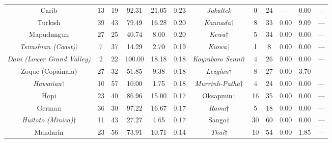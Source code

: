 \begin{tabular}{cccccccccccc}
Carib & 13 & 19 & 92.31 & 21.05 & 0.23 & \emph{Jakaltek} & 0 & 24 & --- & 0.00 & --- \\
Turkish & 39 & 43 & 79.49 & 16.28 & 0.20 & \emph{Kannada}$\dagger$ & 8 & 33 & 0.00 & 9.09 & --- \\
Mapudungun & 27 & 25 & 40.74 & 8.00 & 0.20 & \emph{Kewa}$\dagger$ & 5 & 34 & 0.00 & 0.00 & --- \\
\emph{Tsimshian (Coast)}$\dagger$ & 7 & 37 & 14.29 & 2.70 & 0.19 & \emph{Kiowa}$\dagger$ & 1 & 8 & 0.00 & 0.00 & --- \\
\emph{Dani (Lower Grand Valley)} & 2 & 22 & 100.00 & 18.18 & 0.18 & \emph{Koyraboro Senni}$\dagger$ & 4 & 26 & 0.00 & 0.00 & --- \\
Zoque (Copainala) & 27 & 32 & 51.85 & 9.38 & 0.18 & \emph{Lezgian}$\dagger$ & 8 & 27 & 0.00 & 3.70 & --- \\
\emph{Hawaiian}$\dagger$ & 10 & 57 & 10.00 & 1.75 & 0.18 & \emph{Murrinh-Patha}$\dagger$ & 4 & 24 & 0.00 & 0.00 & --- \\
Hopi & 23 & 40 & 86.96 & 15.00 & 0.17 & Oksapmin$\dagger$ & 16 & 35 & 0.00 & 0.00 & --- \\
German & 36 & 30 & 97.22 & 16.67 & 0.17 & \emph{Rama}$\dagger$ & 5 & 18 & 0.00 & 0.00 & --- \\
\emph{Huitoto (Minica)}$\dagger$ & 11 & 43 & 27.27 & 4.65 & 0.17 & Sango$\dagger$ & 30 & 60 & 0.00 & 0.00 & --- \\
Mandarin & 23 & 56 & 73.91 & 10.71 & 0.14 & \emph{Thai}$\dagger$ & 10 & 54 & 0.00 & 1.85 & ---
\end{tabular}